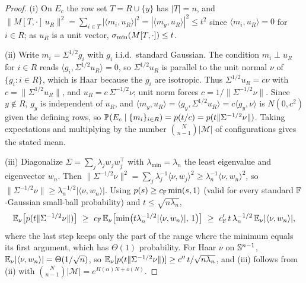 \begin{proof}
(i) On $E_c$ the row set $T=R\cup\{y\}$ has $|T|=n$, and $\|M[T,\cdot]\,u_R\|^2=\sum_{i\in T}|\langle m_i,u_R\rangle|^2=|\langle m_y,u_R\rangle|^2\le t^2$
since $\langle m_i,u_R\rangle=0$ for $i\in R$; as $u_R$ is a unit vector, $\sigma_{\min}(M[T,\cdot])\le t$.

(ii) Write $m_i=\Sigma^{1/2}g_i$ with $g_i$ i.i.d.\ standard Gaussian. The condition $m_i\perp u_R$ for
$i\in R$ reads $\langle g_i,\Sigma^{1/2}u_R\rangle=0$, so $\Sigma^{1/2}u_R$ is parallel to the unit normal
$\nu$ of $\{g_i:i\in R\}$, which is Haar because the $g_i$ are isotropic. Thus $\Sigma^{1/2}u_R=c\nu$ with
$c=\|\Sigma^{1/2}u_R\|$, and $u_R=c\,\Sigma^{-1/2}\nu$; unit norm forces $c=1/\|\Sigma^{-1/2}\nu\|$. Since
$y\notin R$, $g_y$ is independent of $u_R$, and $\langle m_y,u_R\rangle=\langle g_y,\Sigma^{1/2}u_R\rangle=c\langle g_y,\nu\rangle$
is $N(0,c^2)$ given the defining rows, so $\mathbb{P}(E_c\mid\{m_i\}_{i\in R})=p(t/c)=p(t\|\Sigma^{-1/2}\nu\|)$.
Taking expectations and multiplying by the number $\binom{N}{n-1}|\mathcal M|$ of configurations gives the
stated mean.

(iii) Diagonalize $\Sigma=\sum_j\lambda_j w_jw_j^\top$ with $\lambda_{\min}=\lambda_n$ the least eigenvalue
and eigenvector $w_n$. Then $\|\Sigma^{-1/2}\nu\|^2=\sum_j\lambda_j^{-1}\langle\nu,w_j\rangle^2\ge\lambda_n^{-1}\langle\nu,w_n\rangle^2$,
so $\|\Sigma^{-1/2}\nu\|\ge\lambda_n^{-1/2}|\langle\nu,w_n\rangle|$. Using $p(s)\ge c_{\mathbb{F}}\min(s,1)$ (valid for
every standard $\mathbb{F}$-Gaussian small-ball probability) and $t\le\sqrt{n\lambda_n}$,
\[
  \EE_\nu\bigl[p(t\|\Sigma^{-1/2}\nu\|)\bigr]\ \ge\ c_\F\,\EE_\nu\bigl[\min\bigl(t\lambda_n^{-1/2}|\langle\nu,w_n\rangle|,\,1\bigr)\bigr]\ \ge\ c_\F'\,t\,\lambda_n^{-1/2}\,\EE_\nu|\langle\nu,w_n\rangle|,
\]
where the last step keeps only the part of the range where the minimum equals its first argument, which
has $\Theta(1)$ probability. For Haar $\nu$ on $\mathbb{S}^{n-1}$, $\mathbb{E}_\nu|\langle\nu,w_n\rangle|=\Theta(1/\sqrt n)$,
so $\mathbb{E}_\nu[p(t\|\Sigma^{-1/2}\nu\|)]\ge c''\,t/\sqrt{n\lambda_n}$, and (iii) follows from (ii) with
$\binom{N}{n-1}|\mathcal M|=e^{H(\alpha)N+o(N)}$.
\end{proof}

